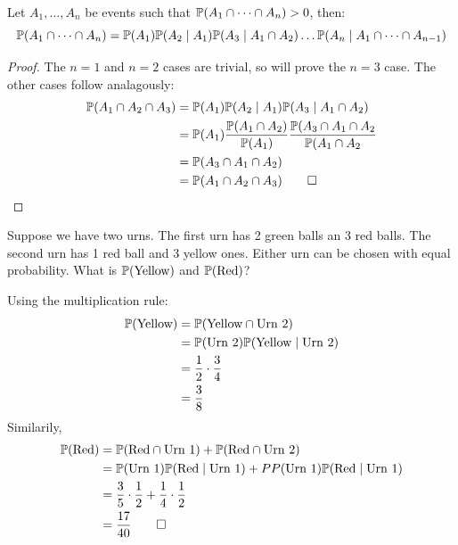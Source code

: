 \begin{propbox}
   Let $A_1, \dots, A_n$ be events such that $\mathbb{P}(A_1 \cap \dots \cap A_n) > 0$, then:
   \[ \mathbb{P}(A_1 \cap \dots \cap A_n) = \mathbb{P}(A_1)\mathbb{P}(A_2 \mid A_1)\mathbb{P}(A_3 \mid A_1 \cap A_2) \dots \mathbb{P}(A_n \mid A_1 \cap \dots \cap A_{n-1}) \]
\end{propbox}
\begin{proof}
   The $n = 1$ and $n = 2$ cases are trivial, so will prove the $n = 3$ case. The other cases follow analagously:
   \begin{align*}
      \mathbb{P}(A_1 \cap A_2 \cap A_3) &= \mathbb{P}(A_1)\mathbb{P}(A_2 \mid A_1)\mathbb{P}(A_3 \mid A_1 \cap A_2) \\
                                 &= \mathbb{P}(A_1)\displaystyle\frac{\mathbb{P}(A_1 \cap A_2)}{\mathbb{P}(A_1)}\displaystyle\frac{\mathbb{P}(A_3 \cap A_1 \cap A_2}{\mathbb{P}(A_1 \cap A_2} \\
                                 &= \mathbb{P}(A_3 \cap A_1 \cap A_2) \\
                                 &= \mathbb{P}(A_1 \cap A_2 \cap A_3) \qedhere
   \end{align*}
\end{proof}

\begin{example}
   Suppose we have two urns. The first urn has 2 green balls an 3 red balls. The second urn has 1 red ball and 3 yellow ones. Either urn can be chosen with equal probability. What is $\mathbb{P}(\text{Yellow})$ and $\mathbb{P}(\text{Red})$?
\end{example}
\begin{solution}
   Using the multiplication rule:
   \begin{align*}
      \mathbb{P}(\text{Yellow}) &= \mathbb{P}(\text{Yellow} \cap \text{Urn 2}) \\
                         &= \mathbb{P}(\text{Urn 2})\mathbb{P}(\text{Yellow} \mid \text{Urn 2}) \\
                         &= \displaystyle\frac{1}{2} \cdot \displaystyle\frac{3}{4} \\
                         &= \displaystyle\frac{3}{8}
   \end{align*}
   Similarily,
   \begin{align*}
      \mathbb{P}(\text{Red}) &= \mathbb{P}(\text{Red} \cap \text{Urn 1}) + \mathbb{P}(\text{Red} \cap \text{Urn 2}) \\
                      &= \mathbb{P}(\text{Urn 1})\mathbb{P}(\text{Red} \mid \text{Urn 1}) + PP(\text{Urn 1})\mathbb{P}(\text{Red} \mid \text{Urn 1})  \\
                      &= \displaystyle\frac{3}{5} \cdot \displaystyle\frac{1}{2} + \displaystyle\frac{1}{4} \cdot \displaystyle\frac{1}{2} \\
                      &= \displaystyle\frac{17}{40} \qedhere
   \end{align*}
\end{solution}

